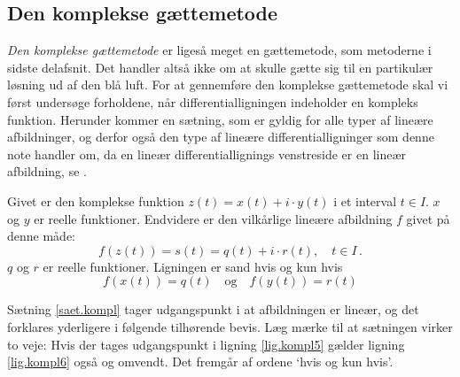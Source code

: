\subsection{Den komplekse gættemetode} \label{af.kompleks}

\textit{Den komplekse gættemetode} er ligeså meget en gættemetode, som metoderne i sidste delafsnit. Det handler altså ikke om at skulle gætte sig til en partikulær løsning ud af den blå luft. For at gennemføre den komplekse gættemetode skal vi først undersøge forholdene, når differentialligningen indeholder en kompleks funktion. Herunder kommer en sætning, som er gyldig for alle typer af lineære afbildninger, og derfor også den type af lineære differentialligninger som denne note handler om, da en lineær differentiallignings venstreside er en lineær afbildning, se .

\begin{theorem} \label{saet.kompl}
Givet er den komplekse funktion $ z(t) = x(t) + i \cdot y(t) $ i et interval $ t \in I $. $ x $ og $ y $ er reelle funktioner. Endvidere er den vilkårlige lineære afbildning $ f $ givet på denne måde:
\begin{equation} \label{lig.kompl5}
f(z(t)) = s(t) = q(t) + i \cdot r(t), \quad t \in I \,.
\end{equation}
$ q $ og $ r $ er reelle funktioner. Ligningen er sand hvis og kun hvis
\begin{equation} \label{lig.kompl6}
f(x(t)) = q(t) \quad \mathrm{og} \quad f(y(t)) = r(t)
\end{equation}
\end{theorem}

Sætning \ref{saet.kompl} tager udgangspunkt i at afbildningen er lineær, og det forklares yderligere i følgende tilhørende bevis. Læg mærke til at sætningen virker to veje: Hvis der tages udgangspunkt i ligning \eqref{lig.kompl5} gælder ligning \eqref{lig.kompl6} også og omvendt. Det fremgår af ordene `hvis og kun hvis'.


